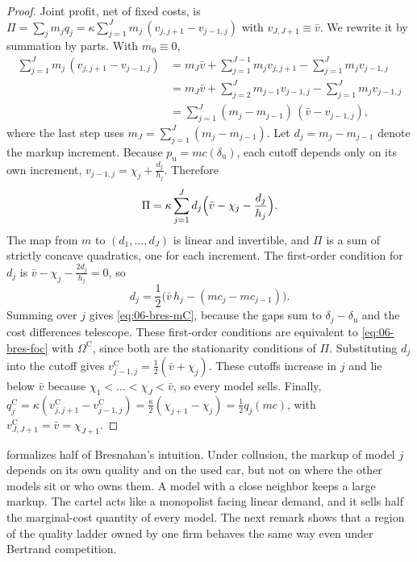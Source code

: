 \begin{proof}
Joint profit, net of fixed costs, is $\Pi = \sum_j m_j q_j = \kappa\sum_{j=1}^J m_j\,(v_{j,j+1} - v_{j-1,j})$ with
$v_{J,J+1} \equiv \bar v$. We rewrite it by summation by parts. With $m_0 \equiv 0$,
\begin{equation*}
\begin{aligned}
  \sum_{j=1}^J m_j\,(v_{j,j+1} - v_{j-1,j})
  &= m_J\bar v + \sum_{j=1}^{J-1} m_j v_{j,j+1} - \sum_{j=1}^{J} m_j v_{j-1,j}\\
  &= m_J\bar v + \sum_{j=2}^{J} m_{j-1} v_{j-1,j} - \sum_{j=1}^{J} m_j v_{j-1,j}\\
  &= \sum_{j=1}^J (m_j - m_{j-1})\,(\bar v - v_{j-1,j}),
\end{aligned}
\end{equation*}
where the last step uses $m_J = \sum_{j=1}^J (m_j - m_{j-1})$. Let $d_j = m_j - m_{j-1}$ denote the markup increment. Because
$p_{\mathrm u} = mc(\delta_{\mathrm u})$, each cutoff depends only on its own increment,
$v_{j-1,j} = \chi_j + \frac{d_j}{h_j}$. Therefore
\begin{equation*}
  \Pi = \kappa\sum_{j=1}^J d_j\Bigl(\bar v - \chi_j - \frac{d_j}{h_j}\Bigr).
\end{equation*}
The map from $m$ to $(d_1,\dots,d_J)$ is linear and invertible, and $\Pi$ is a sum of strictly concave
quadratics, one for each increment. The first-order condition for $d_j$ is
$\bar v - \chi_j - \frac{2d_j}{h_j} = 0$, so
\begin{equation*}
  d_j = \frac{1}{2}\bigl(\bar v\,h_j - (mc_j - mc_{j-1})\bigr).
\end{equation*}
Summing over $j$ gives \eqref{eq:06-bres-mC}, because the gaps sum to $\delta_j - \delta_{\mathrm u}$ and the cost
differences telescope. These first-order conditions are equivalent to \eqref{eq:06-bres-foc} with $\Omega^{\mathrm C}$,
since both are the stationarity conditions of $\Pi$. Substituting $d_j$ into the cutoff gives
$v^{\mathrm C}_{j-1,j} = \frac{1}{2}(\bar v + \chi_j)$. These cutoffs increase in $j$ and lie below $\bar v$ because
$\chi_1 < \dots < \chi_J < \bar v$, so every model sells. Finally,
$q_j^{\mathrm C} = \kappa(v^{\mathrm C}_{j,j+1} - v^{\mathrm C}_{j-1,j}) = \frac{\kappa}{2}(\chi_{j+1} - \chi_j) = \frac{1}{2}q_j(mc)$,
with $v^{\mathrm C}_{J,J+1} = \bar v = \chi_{J+1}$.
\end{proof}

 formalizes half of Bresnahan's intuition. Under collusion, the markup of model $j$ depends on
its own quality and on the used car, but not on where the other models sit or who owns them. A model with a close
neighbor keeps a large markup. The cartel acts like a monopolist facing linear demand, and it sells half the
marginal-cost quantity of every model. The next remark shows that a region of the quality ladder owned by one firm
behaves the same way even under Bertrand competition.

